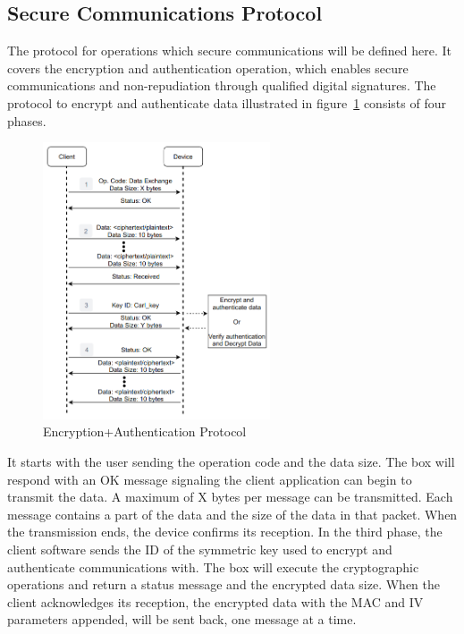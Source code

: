 \subsection{Secure Communications Protocol}\label{chap:implementation:protocol:comms}

The protocol for operations which secure communications will be defined here. It covers the encryption and authentication operation, which enables secure communications and non-repudiation through qualified digital signatures.
The protocol to encrypt and authenticate data illustrated in figure~\ref{fig:protocol:data-exchange} consists of four phases.

\begin{figure}[h!]
	\centering
	\includegraphics[width=0.6\textwidth]{./Images/data-exchange.png}
	\caption{Encryption+Authentication Protocol}
	\label{fig:protocol:data-exchange}
\end{figure}

It starts with the user sending the operation code and the data size. The box will respond with an OK message signaling the client application can begin to transmit the data. A maximum of X bytes per message can be transmitted. Each message contains a part of the data and the size of the data in that packet. When the transmission ends, the device confirms its reception.
In the third phase, the client software sends the ID of the symmetric key used to encrypt and authenticate communications with. The box will execute the cryptographic operations and return a status message and the encrypted data size.
When the client acknowledges its reception, the encrypted data with the \ac{MAC} and \ac{IV} parameters appended, will be sent back, one message at a time.

